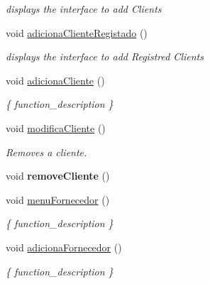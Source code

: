 \begin{DoxyCompactItemize}
\begin{DoxyCompactList}\small\item\em displays the interface to add Clients \end{DoxyCompactList}\item 
\mbox{\label{classEmpresa_a430c00a63ef70338de3b4b7c096ea194}} 
void \hyperlink{classEmpresa_a430c00a63ef70338de3b4b7c096ea194}{adiciona\+Cliente\+Registado} ()
\begin{DoxyCompactList}\small\item\em displays the interface to add Registred Clients \end{DoxyCompactList}\item 
\mbox{\label{classEmpresa_aba4af6a945948ac66e771a416cfc2a2a}} 
void \hyperlink{classEmpresa_aba4af6a945948ac66e771a416cfc2a2a}{adiciona\+Cliente} ()
\begin{DoxyCompactList}\small\item\em \{ function\+\_\+description \} \end{DoxyCompactList}\item 
\mbox{\label{classEmpresa_a9b938f2436e95e68afce6cc04f2100bc}} 
void \hyperlink{classEmpresa_a9b938f2436e95e68afce6cc04f2100bc}{modifica\+Cliente} ()
\begin{DoxyCompactList}\small\item\em Removes a cliente. \end{DoxyCompactList}\item 
\mbox{\label{classEmpresa_ab9af9446d6d2c206b4b3e18e1bcb6475}} 
void {\bfseries remove\+Cliente} ()
\item 
\mbox{\label{classEmpresa_adb9d8d4aa55f253fc534e220ca4a87ac}} 
void \hyperlink{classEmpresa_adb9d8d4aa55f253fc534e220ca4a87ac}{menu\+Fornecedor} ()
\begin{DoxyCompactList}\small\item\em \{ function\+\_\+description \} \end{DoxyCompactList}\item 
\mbox{\label{classEmpresa_af20261a3f95a5dd0c4a5a796d9a3d442}} 
void \hyperlink{classEmpresa_af20261a3f95a5dd0c4a5a796d9a3d442}{adiciona\+Fornecedor} ()
\begin{DoxyCompactList}\small\item\em \{ function\+\_\+description \} \end{DoxyCompactList}\item 

\end{DoxyCompactItemize}
